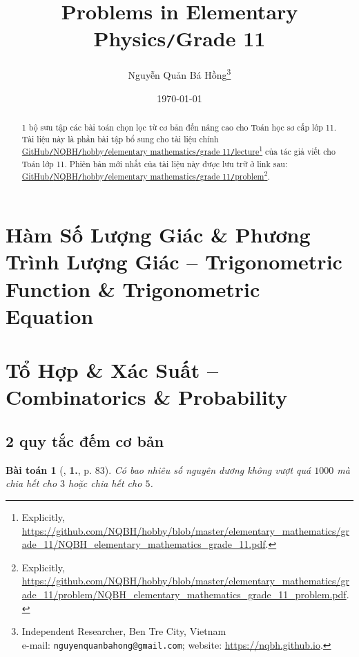 \documentclass{article}
\title{Problems in Elementary Physics\texttt{/}Grade 11}
\author{Nguyễn Quản Bá Hồng\footnote{Independent Researcher, Ben Tre City, Vietnam\\e-mail: \texttt{nguyenquanbahong@gmail.com}; website: \url{https://nqbh.github.io}.}}
\date{\today}
\numberwithin{equation}{section}
\newtheorem{baitoan}{Bài toán}[section]
\begin{document}
\maketitle
\begin{abstract}
	1 bộ sưu tập các bài toán chọn lọc từ cơ bản đến nâng cao cho Toán học sơ cấp lớp 11. Tài liệu này là phần bài tập bổ sung cho tài liệu chính \href{https://github.com/NQBH/hobby/blob/master/elementary_mathematics/grade_11/NQBH_elementary_mathematics_grade_11.pdf}{GitHub\texttt{/}NQBH\texttt{/}hobby\texttt{/}elementary mathematics\texttt{/}grade 11\texttt{/}lecture}\footnote{Explicitly, \url{https://github.com/NQBH/hobby/blob/master/elementary_mathematics/grade_11/NQBH_elementary_mathematics_grade_11.pdf}.} của tác giả viết cho Toán lớp 11. Phiên bản mới nhất của tài liệu này được lưu trữ ở link sau: \href{https://github.com/NQBH/hobby/blob/master/elementary_mathematics/grade_11/problem/NQBH_elementary_mathematics_grade_11_problem.pdf}{GitHub\texttt{/}NQBH\texttt{/}hobby\texttt{/}elementary mathematics\texttt{/}grade 11\texttt{/}problem}\footnote{Explicitly, \url{https://github.com/NQBH/hobby/blob/master/elementary_mathematics/grade_11/problem/NQBH_elementary_mathematics_grade_11_problem.pdf}.}.
\end{abstract}
\tableofcontents
\newpage


\section{Hàm Số Lượng Giác \& Phương Trình Lượng Giác -- Trigonometric Function \& Trigonometric Equation}


\section{Tổ Hợp \& Xác Suất -- Combinatorics \& Probability}

\subsection{2 quy tắc đếm cơ bản}

\begin{baitoan}[\cite{TL_chuyen_Toan_Dai_So_Giai_Tich_11}, \textbf{1.}, p. 83]
	Có bao nhiêu số nguyên dương không vượt quá $1000$ mà chia hết cho $3$ hoặc chia hết cho $5$.
\end{baitoan}
\end{document}
